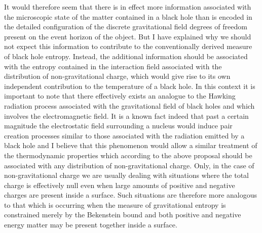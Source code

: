 \documentclass[notitlepage,12pt]{report}
\begin{document}
It would therefore seem that there is in effect more information associated with the microscopic state of the matter contained in a black hole than is encoded in the detailed configuration of the discrete gravitational field degrees of freedom present on the event horizon of the object. But I have explained why we should not expect this information to contribute to the conventionally derived measure of black hole entropy. Instead, the additional information should be associated with the entropy contained in the interaction field associated with the distribution of non-gravitational charge, which would give rise to its own independent contribution to the temperature of a black hole. In this context it is important to note that there effectively exists an analogue to the Hawking radiation process associated with the gravitational field of black holes and which involves the electromagnetic field. It is a known fact indeed that past a certain magnitude the electrostatic field surrounding a nucleus would induce pair creation processes similar to those associated with the radiation emitted by a black hole and I believe that this phenomenon would allow a similar treatment of the thermodynamic properties which according to the above proposal should be associated with any distribution of non-gravitational charge. Only, in the case of non-gravitational charge we are usually dealing with situations where the total charge is effectively null even when large amounts of positive and negative charges are present inside a surface. Such situations are therefore more analogous to that which is occurring when the measure of gravitational entropy is constrained merely by the Bekenstein bound and both positive and negative energy matter may be present together inside a surface.
\end{document}
